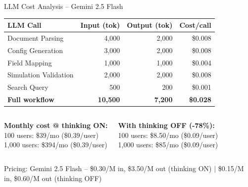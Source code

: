 \documentclass[aspectratio=169,11pt]{beamer}
\begin{document}
\begin{frame}{LLM Cost Analysis -- Gemini 2.5 Flash}
\small
\begin{center}
\begin{tabular}{lrrr}
\toprule
\textbf{LLM Call} & \textbf{Input (tok)} & \textbf{Output (tok)} & \textbf{Cost/call} \\
\midrule
Document Parsing & 4{,}000 & 2{,}000 & \$0.008 \\
Config Generation & 3{,}000 & 2{,}000 & \$0.008 \\
Field Mapping & 1{,}000 & 1{,}000 & \$0.004 \\
Simulation Validation & 2{,}000 & 2{,}000 & \$0.008 \\
Search Query & 500 & 200 & \$0.001 \\
\midrule
\textbf{Full workflow} & \textbf{10{,}500} & \textbf{7{,}200} & \textbf{\$0.028} \\
\bottomrule
\end{tabular}
\end{center}

\vspace{0.5em}
\begin{columns}[T]
\textbf{Monthly cost @ thinking ON:}\\
100 users: \textcolor{ok}{\$39/mo} (\$0.39/user)\\
1{,}000 users: \textcolor{ok}{\$394/mo} (\$0.39/user)

\textbf{With thinking OFF (-78\%):}\\
100 users: \textcolor{ok}{\$8.50/mo} (\$0.09/user)\\
1{,}000 users: \textcolor{ok}{\$85/mo} (\$0.09/user)
\end{columns}

\vspace{0.3em}
{\footnotesize\color{ts} Pricing: Gemini 2.5 Flash -- \$0.30/M in, \$3.50/M out (thinking ON) $\mid$ \$0.15/M in, \$0.60/M out (thinking OFF)}
\end{frame}
\end{document}
